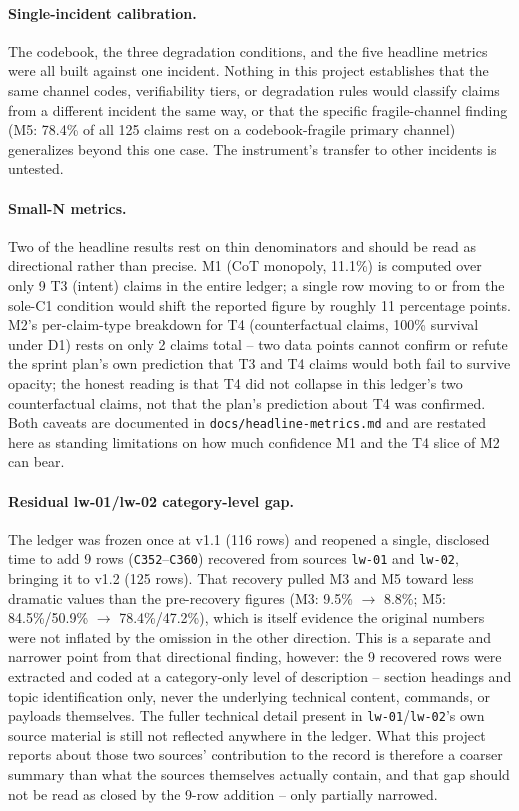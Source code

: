 \paragraph{Single-incident calibration.} The codebook, the three degradation
conditions, and the five headline metrics were all built against one
incident. Nothing in this project establishes that the same channel codes,
verifiability tiers, or degradation rules would classify claims from a
different incident the same way, or that the specific fragile-channel
finding (M5: 78.4\% of all 125 claims rest on a codebook-fragile primary
channel) generalizes beyond this one case. The instrument's transfer to
other incidents is untested.

\paragraph{Small-N metrics.} Two of the headline results rest on thin
denominators and should be read as directional rather than precise. M1 (CoT
monopoly, 11.1\%) is computed over only 9 T3 (intent) claims in the entire
ledger; a single row moving to or from the sole-C1 condition would shift the
reported figure by roughly 11 percentage points. M2's per-claim-type
breakdown for T4 (counterfactual claims, 100\% survival under D1) rests on
only 2 claims total -- two data points cannot confirm or refute the sprint
plan's own prediction that T3 and T4 claims would both fail to survive
opacity; the honest reading is that T4 did not collapse in this ledger's two
counterfactual claims, not that the plan's prediction about T4 was
confirmed. Both caveats are documented in \texttt{docs/headline-metrics.md}
and are restated here as standing limitations on how much confidence M1 and
the T4 slice of M2 can bear.

\paragraph{Residual lw-01/lw-02 category-level gap.} The ledger was frozen
once at v1.1 (116 rows) and reopened a single, disclosed time to add 9 rows
(\texttt{C352}--\texttt{C360}) recovered from sources \texttt{lw-01} and
\texttt{lw-02}, bringing it to v1.2 (125 rows). That recovery pulled M3 and
M5 toward less dramatic values than the pre-recovery figures (M3: 9.5\%
$\rightarrow$ 8.8\%; M5: 84.5\%/50.9\% $\rightarrow$ 78.4\%/47.2\%), which is
itself evidence the original numbers were not inflated by the omission in
the other direction. This is a separate and narrower point from that
directional finding, however: the 9 recovered rows were extracted and coded
at a category-only level of description -- section headings and topic
identification only, never the underlying technical content, commands, or
payloads themselves. The fuller technical detail present in
\texttt{lw-01}/\texttt{lw-02}'s own source material is still not reflected
anywhere in the ledger. What this project reports about those two sources'
contribution to the record is therefore a coarser summary than what the
sources themselves actually contain, and that gap should not be read as
closed by the 9-row addition -- only partially narrowed.


